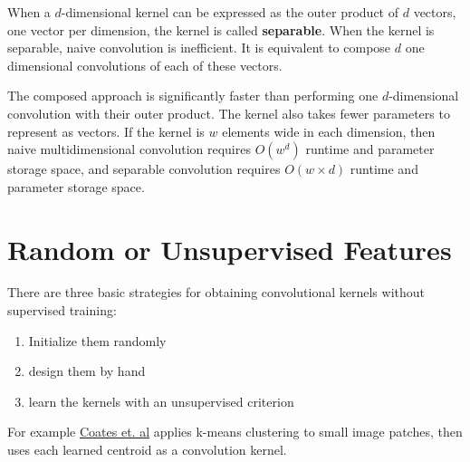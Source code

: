 \documentclass[onecolumn, letterpaper, 12pt]{report}
\begin{document}
When a $d$-dimensional kernel can be expressed as the outer product of $d$ vectors, one vector per dimension, the kernel is called \textbf{separable}. When the kernel is separable, naive convolution is inefficient. It is equivalent to compose $d$ one dimensional convolutions of each of these vectors. 

The composed approach is significantly faster than performing one $d$-dimensional convolution with their outer product. The kernel also takes fewer parameters to represent as vectors. If the kernel is $w$ elements wide in each dimension, then naive multidimensional convolution requires $O(w^d)$ runtime and parameter storage space, and separable convolution requires $O(w \times d)$ runtime and parameter storage space. 

\section{Random or Unsupervised Features}

There are three basic strategies for obtaining convolutional kernels without supervised training: 

\begin{enumerate}
\item Initialize them randomly
\item design them by hand
\item learn the kernels with an unsupervised criterion
\end{enumerate}

For example \href{http://ai.stanford.edu/~acoates/papers/coatesleeng_aistats_2011.pdf}{Coates et. al} applies k-means clustering to small image patches, then uses each learned centroid as a convolution kernel. 
\end{document}
